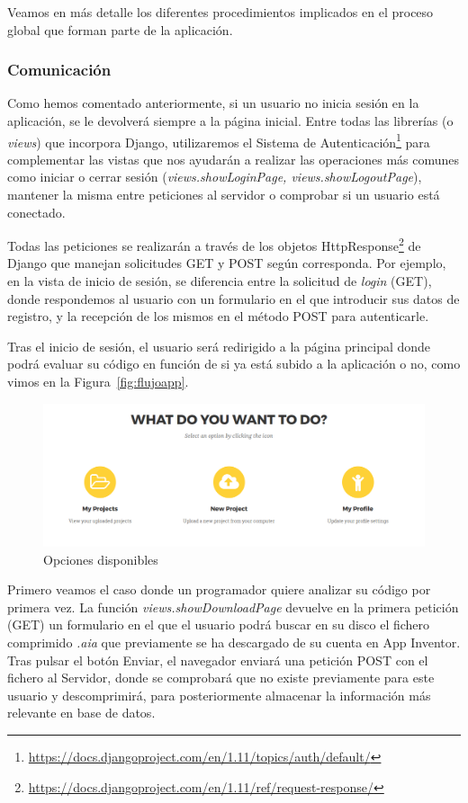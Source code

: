\documentclass[a4paper, 12pt]{book}
\begin{document}
Veamos en más detalle los diferentes procedimientos implicados en el proceso global que forman parte de la aplicación.
\subsubsection{Comunicación}
Como hemos comentado anteriormente, si un usuario no inicia sesión en la aplicación, se le devolverá siempre a la página inicial. Entre todas las librerías (o \textit{views}) que incorpora Django, utilizaremos el Sistema de Autenticación\footnote{\url{https://docs.djangoproject.com/en/1.11/topics/auth/default/}} para complementar las vistas que nos ayudarán a realizar las operaciones más comunes como iniciar o cerrar sesión (\textit{views.showLoginPage, views.showLogoutPage}), mantener la misma entre peticiones al servidor o comprobar si un usuario está conectado. 

Todas las peticiones se realizarán a través de los objetos HttpResponse\footnote{\url{https://docs.djangoproject.com/en/1.11/ref/request-response/}} de Django que manejan solicitudes GET y POST según corresponda. Por ejemplo, en la vista de inicio de sesión, se diferencia entre la solicitud de \textit{login} (GET), donde respondemos al usuario con un formulario en el que introducir sus datos de registro, y la recepción de los mismos en el método POST para autenticarle. 

Tras el inicio de sesión, el usuario será redirigido a la página principal donde podrá evaluar su código en función de si ya está subido a la aplicación o no, como vimos en la Figura~\ref{fig:flujoapp}. 

\begin{figure}[H]
  \centering
  \includegraphics[width=\linewidth, keepaspectratio]{img/usercontent}
  \caption{Opciones disponibles}
  \label{fig:usercontent}
\end{figure}

Primero veamos el caso donde un programador quiere analizar su código por primera vez. La función \textit{views.showDownloadPage} devuelve en la primera petición (GET) un formulario en el que el usuario podrá buscar en su disco el fichero comprimido \textit{.aia} que previamente se ha descargado de su cuenta en App Inventor. Tras pulsar el botón Enviar, el navegador enviará una petición POST con el fichero al Servidor, donde se comprobará que no existe previamente para este usuario y descomprimirá, para posteriormente almacenar la información más relevante en base de datos. 
\end{document}
